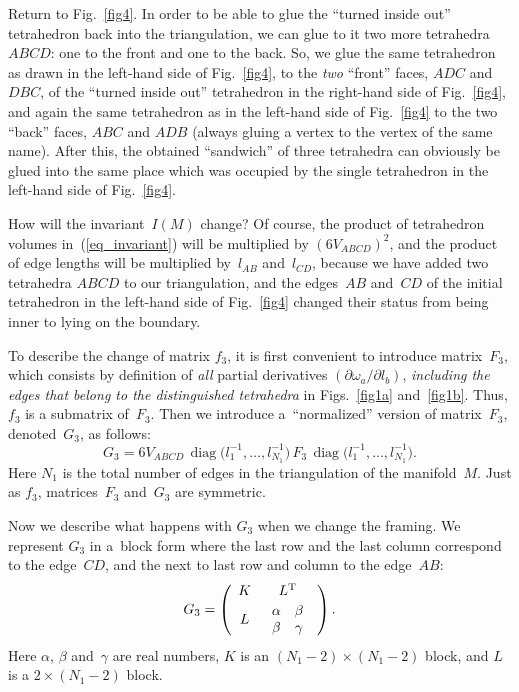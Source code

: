 \documentclass[pdftex]{sigma}
\DeclareMathOperator{\diag}{diag}
\begin{document}
Return to Fig.~\ref{fig4}. In order to be able to glue the ``turned inside out'' tetrahedron back into the triangulation, we can glue to it two more tetrahedra~$ABCD$: one to the front and one to the back. So, we glue the same tetrahedron as drawn in the left-hand side of Fig.~\ref{fig4}, to the \emph{two} ``front'' faces, $ADC$ and $DBC$, of the ``turned inside out'' tetrahedron in the right-hand side of Fig.~\ref{fig4}, and again the same tetrahedron as in the left-hand side of Fig.~\ref{fig4} to the two ``back'' faces, $ABC$ and $ADB$ (always gluing a vertex to the vertex of the same name). After this, the obtained ``sandwich'' of three tetrahedra can obviously be glued into the same place which was occupied by the single tetrahedron in the left-hand side of Fig.~\ref{fig4}.

How will the invariant~$I(M)$ change? Of course, the product of tetrahedron volumes in~(\ref{eq_invariant}) will be multiplied by $(6V_{ABCD})^2$, and the product of edge lengths will be multiplied by~$l_{AB}$ and~$l_{CD}$, because we have added two tetrahedra $ABCD$ to our triangulation, and the edges~$AB$ and~$CD$ of the initial tetrahedron in the left-hand side of Fig.~\ref{fig4} changed their status from being inner to lying on the boundary.

To describe the change of matrix $f_3$, it is f\/irst convenient to introduce matrix~$F_3$, which consists by def\/inition of \emph{all} partial derivatives $(\partial\omega_a / \partial l_b)$, \emph{including the edges that belong to the distinguished tetrahedra} in Figs.~\ref{fig1a} and~\ref{fig1b}. Thus, $f_3$ is a submatrix of~$F_3$. Then we introduce a~``normalized'' version of matrix~$F_3$, denoted~$G_3$, as follows:
\begin{equation}
G_3 = 6V_{ABCD}\, \diag\big(l_1^{-1},\ldots,l_{N_1}^{-1}\big)\,F_3\,\diag\big(l_1^{-1},\ldots,l_{N_1}^{-1}\big).
\label{eq_*}
\end{equation}
Here $N_1$ is the total number of edges in the triangulation of the manifold~$M$. Just as $f_3$, mat\-ri\-ces~$F_3$ and~$G_3$ are symmetric.

Now we describe what happens with $G_3$ when we change the framing. We represent $G_3$ in a~block form where the last row and the
last column correspond to the edge~$CD$, and the next to last row and column to the edge~$AB$:
\begin{equation}
G_3=\left( \begin{array}{cc} K & L^{\rm T} \\[.5ex] L & \begin{array}{cc} \alpha & \beta \\
\beta & \gamma \end{array} \end{array}\right). \label{eq_**}
\end{equation}
Here $\alpha$, $\beta$ and~$\gamma$ are real numbers, $K$ is an $(N_1-2)\times (N_1-2)$ block, and $L$ is a $2\times (N_1-2)$ block.
\end{document}
